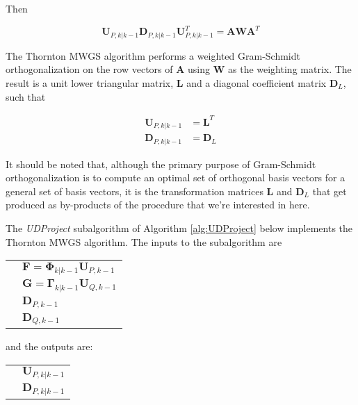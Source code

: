 Then

\begin{equation*}
    \mathbf{U}_{P,k|k-1} \mathbf{D}_{P,k|k-1} \mathbf{U}_{P,k|k-1}^T = \mathbf{A} \mathbf{W} \mathbf{A}^T
\end{equation*}

The Thornton MWGS algorithm performs a weighted Gram-Schmidt orthogonalization on the row
vectors of $\mathbf{A}$ using $\mathbf{W}$ as the weighting matrix. The result is a unit
lower triangular matrix, $\mathbf{L}$ and a diagonal coefficient matrix $\mathbf{D}_L$,
such that

\begin{equation*}
    \begin{aligned}
        \mathbf{U}_{P,k|k-1} &= \mathbf{L}^T \\
        \mathbf{D}_{P,k|k-1} &= \mathbf{D}_L
    \end{aligned}
\end{equation*}

It should be noted that, although the primary purpose of Gram-Schmidt orthogonalization is
to compute an optimal set of orthogonal basis vectors for a general set of basis vectors,
it is the transformation matrices $\mathbf{L}$ and $\mathbf{D}_L$ that get produced as
by-products of the procedure that we’re interested in here.

The \textit{UDProject} subalgorithm of Algorithm \ref{alg:UDProject} below implements the
Thornton MWGS algorithm. The inputs to the subalgorithm are

\begin{tabular}{l l}
\phantom{.} & $\mathbf{F} = \mathbf{\Phi}_{k|k-1} \mathbf{U}_{P,k-1}$ \\
\phantom{.} & $\mathbf{G} = \mathbf{\Gamma}_{k|k-1} \mathbf{U}_{Q,k-1}$ \\
\phantom{.} & $\mathbf{D}_{P,k-1}$ \\
\phantom{.} & $\mathbf{D}_{Q,k-1}$
\end{tabular}

and the outputs are:

\begin{tabular}{l l}
\phantom{.} & $\mathbf{U}_{P,k|k-1}$ \\
\phantom{.} & $\mathbf{D}_{P,k|k-1}$
\end{tabular}

